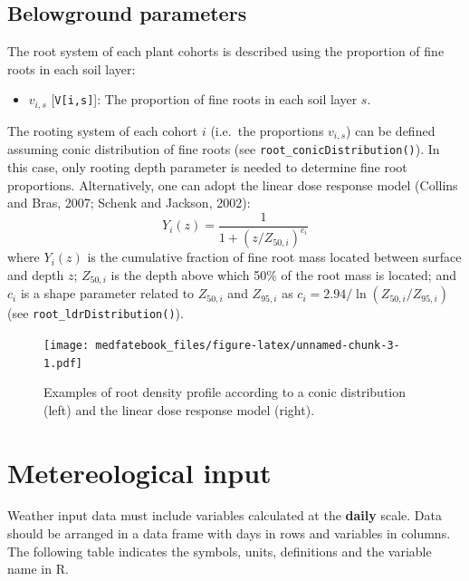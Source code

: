 \documentclass[]{book}
\providecommand{\tightlist}{%
  \setlength{\itemsep}{0pt}\setlength{\parskip}{0pt}}
\begin{document}
\hypertarget{belowground-parameters}{%
\subsection{Belowground parameters}\label{belowground-parameters}}

The root system of each plant cohorts is described using the proportion of fine
roots in each soil layer:

\begin{itemize}
\tightlist
\item
  \(v_{i,s}\) {[}\texttt{V{[}i,s{]}}{]}: The proportion of fine roots in each soil layer \(s\).
\end{itemize}

The rooting system of each cohort \(i\) (i.e.~the proportions \(v_{i,s}\)) can be defined assuming conic distribution of fine roots (see \texttt{root\_conicDistribution()}). In this case, only rooting depth parameter is needed to determine fine root proportions. Alternatively, one can adopt the linear dose response model (Collins and Bras, 2007; Schenk and Jackson, 2002):
\begin{equation}
Y_i(z)=\frac{1}{1+(z/Z_{50,i})^{c_i}}
\end{equation}
where \(Y_i(z)\) is the cumulative fraction of fine root mass located between surface and depth \(z\); \(Z_{50,i}\) is the depth above which 50\% of the root mass is located; and \(c_i\) is a shape parameter related to \(Z_{50,i}\) and \(Z_{95,i}\) as \(c_i = 2.94 / \ln(Z_{50,i} / Z_{95,i})\) (see \texttt{root\_ldrDistribution()}).

\begin{figure}
\centering
\texttt{[image: medfatebook\_files/figure-latex/unnamed-chunk-3-1.pdf]}
\caption{\label{fig:unnamed-chunk-3}Examples of root density profile according to a conic distribution (left) and the linear dose response model (right).}
\end{figure}

\hypertarget{meteoinput}{%
\section{Metereological input}\label{meteoinput}}

Weather input data must include variables calculated at the \textbf{daily} scale. Data should be arranged in a data frame with days in rows and variables in columns. The following table indicates the symbols, units, definitions and the variable name in R.
\end{document}
